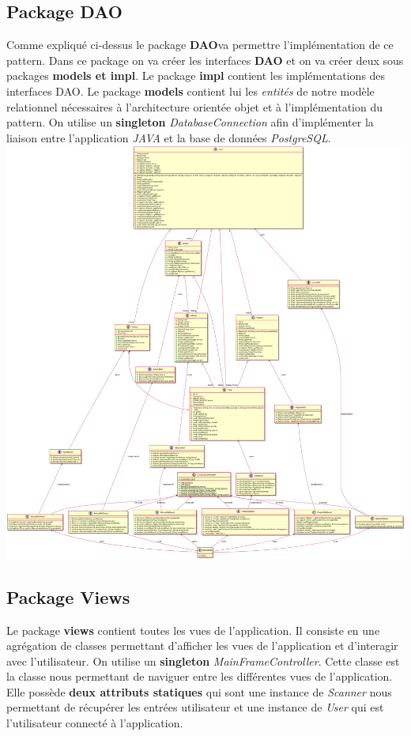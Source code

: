 \documentclass[a4paper,12pt, french]{report}
\begin{document}
		\subsection{Package DAO}
		Comme expliqué ci-dessus le package \textbf{DAO}va permettre l'implémentation de ce pattern. Dans ce package on va créer les interfaces \textbf{DAO} et on va créer deux sous packages \textbf{models et impl}. Le package \textbf{impl} contient les implémentations des interfaces DAO. Le package \textbf{models} contient lui les \emph{entités} de notre modèle relationnel nécessaires à l'architecture orientée objet et à l'implémentation du pattern. On utilise un \textbf{singleton} \emph{DatabaseConnection} afin d'implémenter la liaison entre l'application \emph{JAVA} et la base de données \emph{PostgreSQL}.
		 \includegraphics[scale=0.2]{class_diagram.png}
		\subsection{Package Views}
		Le package \textbf{views} contient toutes les vues de l'application. Il consiste en une agrégation de classes permettant d'afficher les vues de l'application et d'interagir avec l'utilisateur. On utilise un \textbf{singleton} \emph{MainFrameController}. Cette classe est la classe nous permettant de naviguer entre les différentes vues de l'application. Elle possède \textbf{deux attributs statiques} qui sont une instance de \emph{Scanner} nous permettant de récupérer les entrées utilisateur et une instance de \emph{User} qui est l'utilisateur connecté à l'application.
\end{document}
